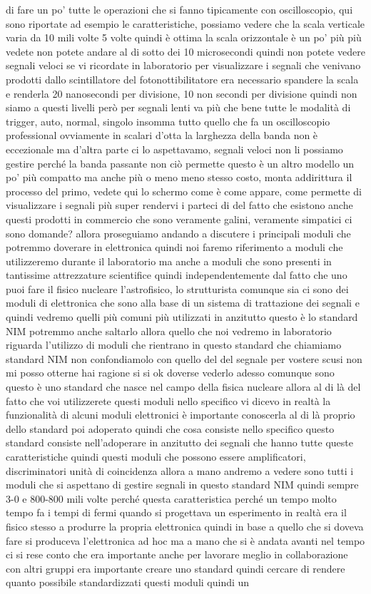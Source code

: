 {di fare un po' tutte le operazioni che si fanno tipicamente con oscilloscopio, qui sono riportate ad esempio le caratteristiche, possiamo vedere che la scala verticale varia da 10 mili volte 5 volte quindi è ottima la scala orizzontale è un po' più più vedete non potete andare al di sotto dei 10 microsecondi quindi non potete vedere segnali veloci se vi ricordate in laboratorio per visualizzare i segnali che venivano prodotti dallo scintillatore del fotonottibilitatore era necessario spandere la scala e renderla 20 nanosecondi per divisione, 10 non secondi per divisione quindi non siamo a questi livelli però per segnali lenti va più che bene tutte le modalità di trigger, auto, normal, singolo insomma tutto quello che fa un oscilloscopio professional ovviamente in scalari d'otta la larghezza della banda non è eccezionale ma d'altra parte ci lo aspettavamo, segnali veloci non li possiamo gestire perché la banda passante non ciò permette questo è un altro modello un po' più compatto ma anche più o meno meno stesso costo, monta addirittura il processo del primo, vedete qui lo schermo come è come appare, come permette di visualizzare i segnali più super rendervi i parteci di del fatto che esistono anche questi prodotti in commercio che sono veramente galini, veramente simpatici ci sono domande? allora proseguiamo andando a discutere i principali moduli che potremmo doverare in elettronica quindi noi faremo riferimento a moduli che utilizzeremo durante il laboratorio ma anche a moduli che sono presenti in tantissime attrezzature scientifice quindi independentemente dal fatto che uno puoi fare il fisico nucleare l'astrofisico, lo strutturista comunque sia ci sono dei moduli di elettronica che sono alla base di un sistema di trattazione dei segnali e quindi vedremo quelli più comuni più utilizzati in anzitutto questo è lo standard NIM potremmo anche saltarlo allora quello che noi vedremo in laboratorio riguarda l'utilizzo di moduli che rientrano in questo standard che chiamiamo standard NIM non confondiamolo con quello del del segnale per vostere scusi non mi posso otterne hai ragione si si ok doverse vederlo adesso comunque sono questo è uno standard che nasce nel campo della fisica nucleare allora al di là del fatto che voi utilizzerete questi moduli nello specifico vi dicevo in realtà la funzionalità di alcuni moduli elettronici è importante conoscerla al di là proprio dello standard poi adoperato quindi che cosa consiste nello specifico questo standard consiste nell'adoperare in anzitutto dei segnali che hanno tutte queste caratteristiche quindi questi moduli che possono essere amplificatori, discriminatori unità di coincidenza allora a mano andremo a vedere sono tutti i moduli che si aspettano di gestire segnali in questo standard NIM quindi sempre 3-0 e 800-800 mili volte perché questa caratteristica perché un tempo molto tempo fa i tempi di fermi quando si progettava un esperimento in realtà era il fisico stesso a produrre la propria elettronica quindi in base a quello che si doveva fare si produceva l'elettronica ad hoc ma a mano che si è andata avanti nel tempo ci si rese conto che era importante anche per lavorare meglio in collaborazione con altri gruppi era importante creare uno standard quindi cercare di rendere quanto possibile standardizzati questi moduli quindi un }
